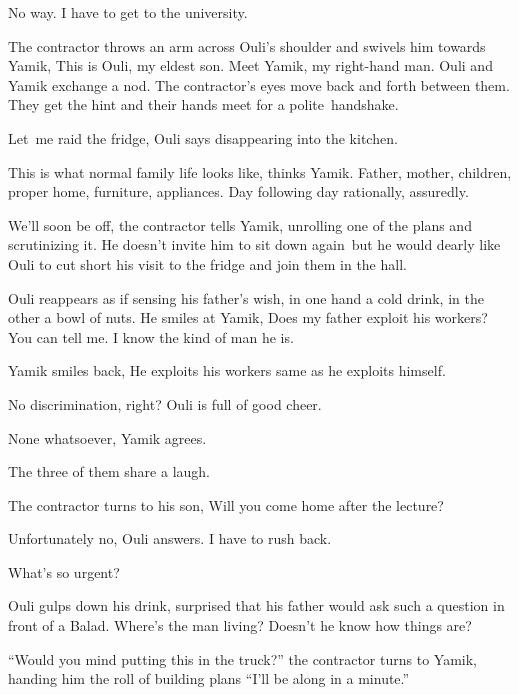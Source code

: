 \documentclass[letterpaper]{article}
\begin{document}
{\textquotedbl}No way. I have to get to the university.{\textquotedbl} 

The contractor throws an arm across Ouli's shoulder and swivels him towards Yamik, {\textquotedbl}This is Ouli, my
eldest son. Meet Yamik, my right{}-hand man.{\textquotedbl} Ouli and Yamik exchange a nod. The contractor's eyes move
back and forth between them. They get the hint and their hands meet for a polite~handshake. 

{\textquotedbl}Let~me raid the fridge,{\textquotedbl} Ouli says disappearing into the kitchen. 

This is what normal family life looks like, thinks Yamik. Father, mother, children, proper home, furniture, appliances.
Day following day rationally, assuredly.

{\textquotedbl}We'll soon be off,{\textquotedbl} the contractor tells Yamik, unrolling one of the plans and scrutinizing
it. He doesn't invite him to sit down again\ but he would dearly like Ouli to cut short his visit to the fridge and
join them in the hall.

Ouli reappears as if sensing his father's wish, in one hand a cold drink, in the other a bowl of nuts. He smiles at
Yamik, {\textquotedbl}Does my father exploit his workers? You can tell me. I know the kind of man he
is.{\textquotedbl}\ 

Yamik smiles back, {\textquotedbl}He exploits his workers same as he exploits himself.{\textquotedbl} 

{\textquotedbl}No discrimination, right?{\textquotedbl} Ouli is full of good cheer.

{\textquotedbl}None whatsoever,{\textquotedbl} Yamik agrees. 

The three of them share a laugh. 

The contractor turns to his son, {\textquotedbl}Will you come home after the lecture?{\textquotedbl} 

{\textquotedbl}Unfortunately no,{\textquotedbl} Ouli answers. {\textquotedbl}I have to rush back.{\textquotedbl} 

{\textquotedbl}What's so urgent?{\textquotedbl} 

Ouli gulps down his drink, surprised that his father would ask such a question in front of a Balad. Where's the man
living? Doesn't he know how things are?\ \ 

{}``Would you mind putting this in the truck?'' the contractor turns to Yamik, handing him the roll of building plans
``I{}'ll be along in a minute.''
\end{document}

